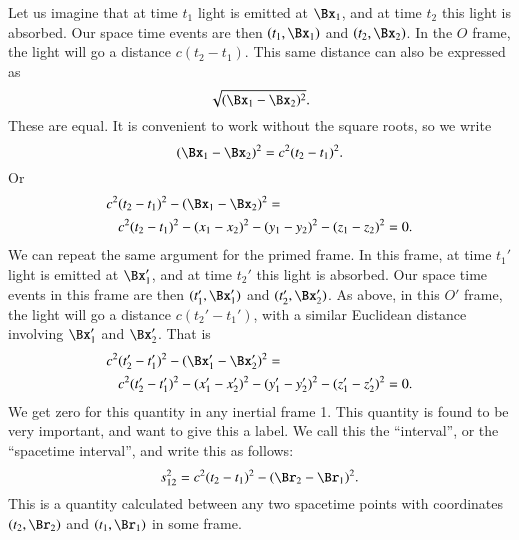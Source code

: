 Let us imagine that at time \(t_1\) light is emitted at \(\Bx_1\), and at time \(t_2\) this light is absorbed.  Our space time events are then \((t_1, \Bx_1)\) and \((t_2, \Bx_2)\).  In the \(O\) frame, the light will go a distance \(c(t_2 - t_1)\).  This same distance can also be expressed as
%
\begin{equation}\label{eqn:relativisticElectrodynamicsL2:10}
\sqrt{ (\Bx_1 - \Bx_2)^2}.
\end{equation}
%
These are equal.  It is convenient to work without the square roots, so we write
%
\begin{equation}\label{eqn:relativisticElectrodynamicsL2:20}
(\Bx_1 - \Bx_2)^2 = c^2 (t_2 - t_1)^2.
\end{equation}
%
Or
%
\begin{equation}\label{eqn:relativisticElectrodynamicsL2:30}
\begin{aligned}
c^2 &(t_2 - t_1)^2 - (\Bx_1 - \Bx_2)^2 = \\
&c^2 (t_2 - t_1)^2
- (x_1 - x_2)^2
- (y_1 - y_2)^2
- (z_1 - z_2)^2 = 0.
\end{aligned}
\end{equation}
%
We can repeat the same argument for the primed frame.  In this frame, at time \(t_1'\) light is emitted at \(\Bx_1'\), and at time \(t_2'\) this light is absorbed.  Our space time events in this frame are then \((t_1', \Bx_1')\) and \((t_2', \Bx_2')\).  As above, in this \(O'\) frame, the light will go a distance \(c(t_2' - t_1')\), with a similar Euclidean distance involving \(\Bx_1'\) and \(\Bx_2'\).  That is
%
\begin{equation}\label{eqn:relativisticElectrodynamicsL2:40}
\begin{aligned}
c^2 &(t_2' - t_1')^2 - (\Bx_1' - \Bx_2')^2 = \\
&c^2 (t_2' - t_1')^2
- (x_1' - x_2')^2
- (y_1' - y_2')^2
- (z_1' - z_2')^2 = 0.
\end{aligned}
\end{equation}
%
We get zero for this quantity in any inertial frame 1.  This quantity is found to be very important, and want to give this a label.  We call this the ``interval'', or the ``spacetime interval'', and write this as follows:
%
\begin{equation}\label{eqn:relativisticElectrodynamicsL2:50}
s_{12}^2 = c^2 (t_2 - t_1)^2 - (\Br_2 - \Br_1)^2.
\end{equation}
%
This is a quantity calculated between any two spacetime points with coordinates \((t_2, \Br_2)\) and \((t_1, \Br_1)\) in some frame.

